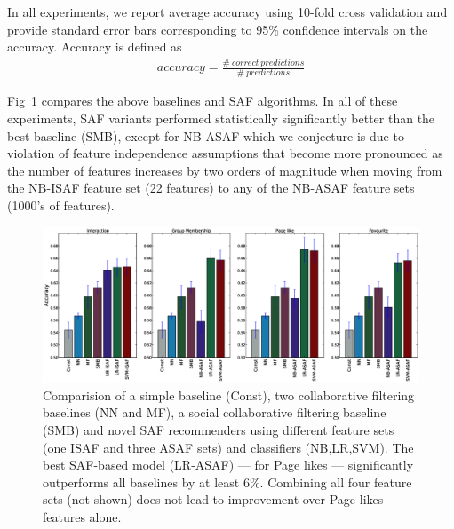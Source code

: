 

In all experiments, we report average accuracy using 10-fold cross
validation and provide standard error bars corresponding to 95\% confidence
intervals on the accuracy. 
Accuracy is defined as  
\begin{align*}
accuracy = \frac{\#\ correct\ predictions}{\#\ predictions}
\end{align*}

Fig~\ref{Fig1} compares the above baselines and SAF algorithms.  In
all of these experiments, SAF variants performed statistically
significantly better than the best baseline (SMB), except for NB-ASAF
which we conjecture is due to violation of feature independence
assumptions that become more pronounced as the number of features
increases by two orders of magnitude when moving from the NB-ISAF
feature set (22 features) to any of the NB-ASAF feature sets (1000's
of features).

\begin{figure}[tbp!]
\hspace{-6mm}\includegraphics[width=190mm]{data/plots/accuracy/accuracyLargeNew.eps}
\caption{Comparision of a simple baseline (Const), two collaborative
  filtering baselines (NN and MF), a social collaborative filtering
  baseline (SMB) and novel SAF recommenders using different feature
  sets (one ISAF and three ASAF sets) and classifiers (NB,LR,SVM).
  The best SAF-based model (LR-ASAF) --- for Page likes --- significantly outperforms
  all baselines by at least 6\%.  Combining all four feature sets (not shown)
  does not lead to improvement over Page likes features alone.}
\label{Fig1}
\end{figure}

